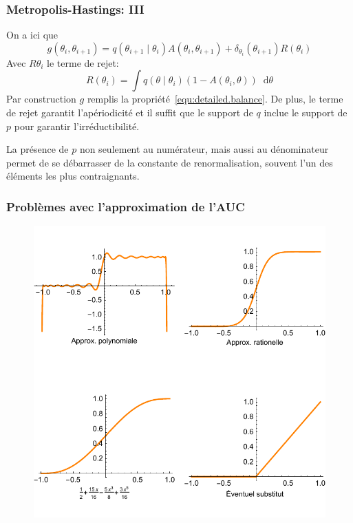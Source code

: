 \documentclass[dvipsnames,10pt]{beamer}
\newcommand*\diff{\mathop{}\!\mathrm{d}}
\theoremstyle{plain}
\theoremstyle{definition}
\begin{document}
\begin{frame}
\frametitle{Metropolis-Hastings: III}
On a ici que
\begin{equation*}
    g( \theta_i , \theta_{i+1} ) = q ( \theta_{i+1} \mid \theta_{i} ) A(\theta_{i},\theta_{i+1}) + \delta_{\theta_{i}} ( \theta_{i+1} ) R(\theta_{i})
\end{equation*}
Avec $R\theta_{i}$ le terme de rejet:
\begin{equation*}
    R(\theta_{i}) = \int q ( \theta \mid \theta_{i} ) ( 1 - A(\theta_{i},\theta) ) \diff \theta
\end{equation*}
Par construction $g$ remplis la propriété~\ref{equ:detailed.balance}. De plus, le terme de rejet garantit l'apériodicité et il suffit que le support de $q$ inclue le support de $p$ pour garantir l'irréductibilité.

La présence de $p$ non seulement au numérateur, mais aussi au dénominateur permet de se débarrasser de la constante de renormalisation, souvent l'un des éléments les plus contraignants.
\end{frame}

\begin{frame}[fragile]
\frametitle{Problèmes avec l'approximation de l'AUC}
\begin{figure}[H]
    \centering
    \includegraphics[scale=0.6]{../images/graphs2}
\end{figure}
\end{frame}
\end{document}

